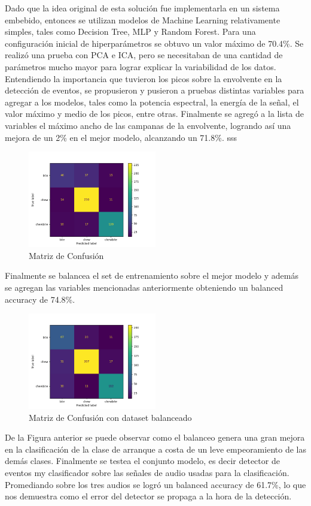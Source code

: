 \documentclass[11pt]{charter}
\begin{document}
Dado que la idea original de esta solución fue implementarla en un sistema embebido, entonces se utilizan modelos de Machine Learning relativamente simples, tales como Decision Tree, MLP y Random Forest. Para una configuración inicial de hiperparámetros se obtuvo un valor máximo de 70.4\%. Se realizó una prueba con PCA e ICA, pero se necesitaban de una cantidad de parámetros mucho mayor para lograr explicar la variabilidad de los datos.
Entendiendo la importancia que tuvieron los picos sobre la envolvente en la detección de eventos, se propusieron y pusieron a pruebas distintas variables para agregar a los modelos, tales como la potencia espectral, la energía de la señal, el valor máximo y medio de los picos, entre otras. Finalmente se agregó a la lista de variables el máximo ancho de las campanas de la envolvente, logrando así una mejora de un 2\% en el mejor modelo, alcanzando un 71.8\%.
sss
\begin{figure}[H]
	\centering 
	\includegraphics[width=0.5\textwidth, scale=0.5]{./Figuras/modelfirst.png}
	\caption{Matriz de Confusión}
	\label{fig:first}
\end{figure}
Finalmente se balancea el set de entrenamiento sobre el mejor modelo y además se agregan las variables mencionadas anteriormente obteniendo un balanced accuracy de 74.8\%. 
\begin{figure}[H]
	\centering 
	\includegraphics[width=0.5\textwidth, scale=0.5]{./Figuras/modelimbsecond.png}
	\caption{Matriz de Confusión con dataset balanceado}
	\label{fig:second}
\end{figure}
De la Figura anterior se puede observar como el balanceo genera una gran mejora en la clasificación de la clase de arranque a costa de un leve empeoramiento de las demás clases.
Finalmente se testea el conjunto modelo, es decir detector de eventos my clasificador sobre las señales de audio usadas para la clasificación. Promediando sobre los tres audios se logró un balanced accuracy de 61.7\%, lo que nos demuestra como el error del detector se propaga a la hora de la detección. 
 
\end{document}
